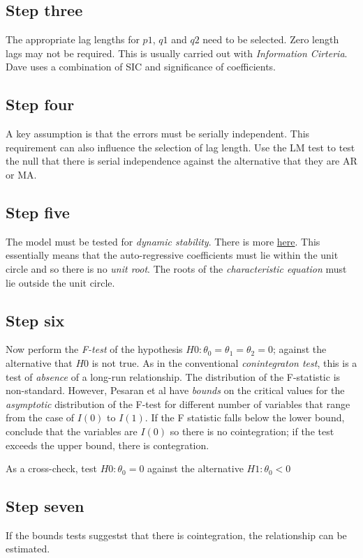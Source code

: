 \documentclass[12pt, a4paper, oneside]{article}\usepackage[]{graphicx}\usepackage[]{color}
\begin{document}
\subsection*{Step three}
The appropriate lag lengths for $p1$, $q1$ and $q2$ need to be selected.  Zero length lags may not be required.  This is usually carried out with \emph{Information Cirteria}.  Dave uses a combination of SIC and significance of coefficients. 

\subsection*{Step four}
A key assumption is that the errors must be serially independent. This requirement can also influence the selection of lag length. Use the LM test to test the null that there is serial independence against the alternative that they are AR or MA. 

\subsection*{Step five}
The model must be tested for \emph{dynamic stability}.  There is more \href{http://davegiles.blogspot.ca/2013/06/when-is-autoregressive-model.html}{here}.  This essentially means that the auto-regressive coefficients must lie within the unit circle and so there is no \emph{unit root}.  The roots of the \emph{characteristic equation} must lie outside the unit circle. 

\subsection*{Step six}
Now perform the \emph{F-test} of the hypothesis $H0: \theta_0 = \theta_1 = \theta_2 = 0$; against the alternative that $H0$ is not true. As in the conventional \emph{conintegraton test}, this is a test of \emph{absence} of a long-run relationship. The distribution of the F-statistic is non-standard.  However, Pesaran et al have \emph{bounds} on the critical values for the \emph{asymptotic} distribution of the F-test for different number of variables that range from the case of $I(0)$ to $I(1)$.  If the F statistic falls below the lower bound, conclude that the variables are $I(0)$ so there is no cointegration; if the test exceeds the upper bound, there is contegration. 

As a cross-check, test $H0: \theta_0 = 0$ against the alternative $H1: \theta_0 < 0$

\subsection*{Step seven}
If the bounds tests suggestst that there is cointegration, the relationship can be estimated. 
\end{document}
